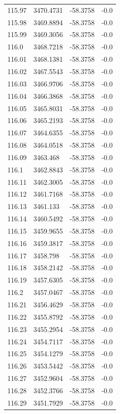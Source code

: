 \begin{table}[H]
\begin{tabular}{llll}
115.97 & 3470.4731 & -58.3758 & -0.0 \\
115.98 & 3469.8894 & -58.3758 & -0.0 \\
115.99 & 3469.3056 & -58.3758 & -0.0 \\
116.0 & 3468.7218 & -58.3758 & -0.0 \\
116.01 & 3468.1381 & -58.3758 & -0.0 \\
116.02 & 3467.5543 & -58.3758 & -0.0 \\
116.03 & 3466.9706 & -58.3758 & -0.0 \\
116.04 & 3466.3868 & -58.3758 & -0.0 \\
116.05 & 3465.8031 & -58.3758 & -0.0 \\
116.06 & 3465.2193 & -58.3758 & -0.0 \\
116.07 & 3464.6355 & -58.3758 & -0.0 \\
116.08 & 3464.0518 & -58.3758 & -0.0 \\
116.09 & 3463.468 & -58.3758 & -0.0 \\
116.1 & 3462.8843 & -58.3758 & -0.0 \\
116.11 & 3462.3005 & -58.3758 & -0.0 \\
116.12 & 3461.7168 & -58.3758 & -0.0 \\
116.13 & 3461.133 & -58.3758 & -0.0 \\
116.14 & 3460.5492 & -58.3758 & -0.0 \\
116.15 & 3459.9655 & -58.3758 & -0.0 \\
116.16 & 3459.3817 & -58.3758 & -0.0 \\
116.17 & 3458.798 & -58.3758 & -0.0 \\
116.18 & 3458.2142 & -58.3758 & -0.0 \\
116.19 & 3457.6305 & -58.3758 & -0.0 \\
116.2 & 3457.0467 & -58.3758 & -0.0 \\
116.21 & 3456.4629 & -58.3758 & -0.0 \\
116.22 & 3455.8792 & -58.3758 & -0.0 \\
116.23 & 3455.2954 & -58.3758 & -0.0 \\
116.24 & 3454.7117 & -58.3758 & -0.0 \\
116.25 & 3454.1279 & -58.3758 & -0.0 \\
116.26 & 3453.5442 & -58.3758 & -0.0 \\
116.27 & 3452.9604 & -58.3758 & -0.0 \\
116.28 & 3452.3766 & -58.3758 & -0.0 \\
116.29 & 3451.7929 & -58.3758 & -0.0 \\

\end{tabular}
\end{table}
